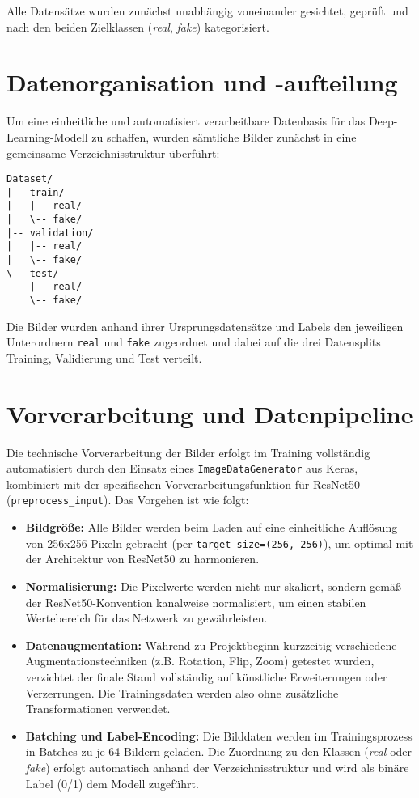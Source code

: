 Alle Datensätze wurden zunächst unabhängig voneinander gesichtet, geprüft und nach den beiden Zielklassen (\emph{real}, \emph{fake}) kategorisiert.

\section{Datenorganisation und -aufteilung}

Um eine einheitliche und automatisiert verarbeitbare Datenbasis für das Deep-Learning-Modell zu schaffen, wurden sämtliche Bilder zunächst in eine gemeinsame Verzeichnisstruktur überführt:

\begin{verbatim}
Dataset/
|-- train/
|   |-- real/
|   \-- fake/
|-- validation/
|   |-- real/
|   \-- fake/
\-- test/
    |-- real/
    \-- fake/
\end{verbatim}

Die Bilder wurden anhand ihrer Ursprungsdatensätze und Labels den jeweiligen Unterordnern \texttt{real} und \texttt{fake} zugeordnet und dabei auf die drei Datensplits Training, Validierung und Test verteilt.

\section{Vorverarbeitung und Datenpipeline}

Die technische Vorverarbeitung der Bilder erfolgt im Training vollständig automatisiert durch den Einsatz eines \texttt{ImageDataGenerator} aus Keras, kombiniert mit der spezifischen Vorverarbeitungsfunktion für ResNet50 (\texttt{preprocess\_input}). Das Vorgehen ist wie folgt:

\begin{itemize}
    \item \textbf{Bildgröße:}  
    Alle Bilder werden beim Laden auf eine einheitliche Auflösung von 256x256 Pixeln gebracht (per \texttt{target\_size=(256, 256)}), um optimal mit der Architektur von ResNet50 zu harmonieren.

    \item \textbf{Normalisierung:}  
    Die Pixelwerte werden nicht nur skaliert, sondern gemäß der ResNet50-Konvention kanalweise normalisiert, um einen stabilen Wertebereich für das Netzwerk zu gewährleisten.

    \item \textbf{Datenaugmentation:}  
    Während zu Projektbeginn kurzzeitig verschiedene Augmentationstechniken (z.B. Rotation, Flip, Zoom) getestet wurden, verzichtet der finale Stand vollständig auf künstliche Erweiterungen oder Verzerrungen. Die Trainingsdaten werden also ohne zusätzliche Transformationen verwendet.

    \item \textbf{Batching und Label-Encoding:}  
    Die Bilddaten werden im Trainingsprozess in Batches zu je 64 Bildern geladen. Die Zuordnung zu den Klassen (\emph{real} oder \emph{fake}) erfolgt automatisch anhand der Verzeichnisstruktur und wird als binäre Label (0/1) dem Modell zugeführt.
\end{itemize}

